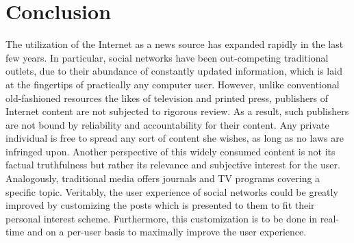 \section{Conclusion}	
	The utilization of the Internet as a news source has expanded rapidly in the last few years. In particular, social networks have been out-competing traditional outlets, due to their abundance of constantly updated information, which is laid at the fingertips of practically any computer user. However, unlike conventional old-fashioned resources the likes of television and printed press, publishers of Internet content are not subjected to rigorous review. As a result, such publishers are not bound by reliability and accountability for their content. Any private individual is free to spread any sort of content she wishes, as long as no laws are infringed upon. Another perspective of this widely consumed content is not its factual truthfulness but rather its relevance and subjective interest for the user. Analogously, traditional media offers journals and TV programs covering a specific topic. Veritably, the user experience of social networks could be greatly improved by customizing the posts which is presented to them to fit their personal interest scheme. Furthermore, this customization is to be done in real-time and on a per-user basis to maximally improve the user experience.
	
